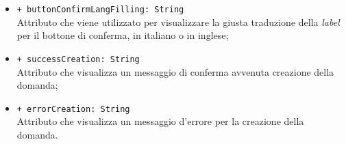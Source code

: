 \begin{itemize}
\begin{itemize}
		\item \texttt{+ buttonConfirmLangFilling: String} \\ Attributo che viene utilizzato per visualizzare la giusta traduzione della \textit{label} per il bottone di conferma, in italiano o in inglese;
		\item \texttt{+ successCreation: String} \\ Attributo che visualizza un messaggio di conferma avvenuta creazione della domanda;
		\item \texttt{+ errorCreation: String} \\ Attributo che visualizza un messaggio d'errore per la creazione della domanda.
	\end{itemize}
\end{itemize}